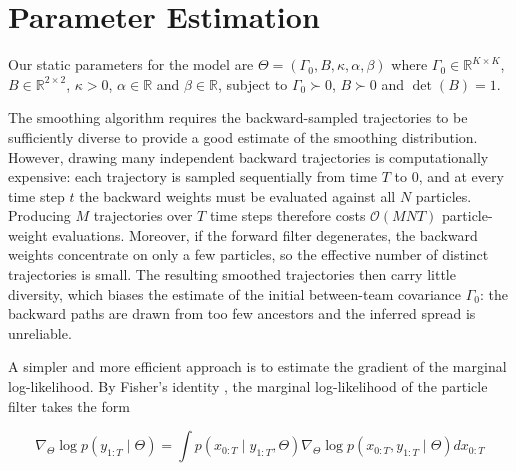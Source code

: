 
\section{Parameter Estimation}
\label{sec:parameter-estimation}

Our static parameters for the model are $\Theta = (\Gamma_0, B, \kappa, \alpha, \beta)$ where $\Gamma_0 \in \mathbb{R}^{K \times K}$, $B \in \mathbb{R}^{2 \times 2}$, $\kappa > 0$, $\alpha \in \mathbb{R}$ and $\beta \in \mathbb{R}$, subject to $\Gamma_0 \succ 0$, $B \succ 0$ and $\det(B) = 1$.

The smoothing algorithm requires the backward-sampled trajectories to be sufficiently diverse to provide a good estimate of the smoothing distribution. However, drawing many independent backward trajectories is computationally expensive: each trajectory is sampled sequentially from time $T$ to $0$, and at every time step $t$ the backward weights must be evaluated against all $N$ particles. Producing $M$ trajectories over $T$ time steps therefore costs $\mathcal{O}(MNT)$ particle-weight evaluations. Moreover, if the forward filter degenerates, the backward weights concentrate on only a few particles, so the effective number of distinct trajectories is small. The resulting smoothed trajectories then carry little diversity, which biases the estimate of the initial between-team covariance $\Gamma_0$: the backward paths are drawn from too few ancestors and the inferred spread is unreliable.

A simpler and more efficient approach is to estimate the gradient of the marginal log-likelihood. By Fisher's identity \citep{delmoral2004feynman,delmoraldoucetsingh2010forwardsmoothing}, the marginal log-likelihood of the particle filter takes the form


\begin{equation}\nabla_\Theta \log p(y_{1:T} \mid \Theta) = \int p(x_{0:T} \mid y_{1:T}, \Theta) \nabla_\Theta \log p(x_{0:T}, y_{1:T} \mid \Theta) dx_{0:T}\end{equation}


